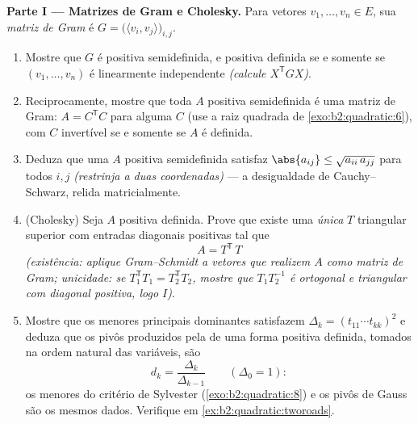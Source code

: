 \begin{problem}
\medskip
\noindent\textbf{Parte I --- Matrizes de Gram e Cholesky.} Para
vetores $v_1, \dots, v_n \in E$, sua \emph{matriz de Gram} é
$G = \bigl(\langle v_i, v_j\rangle\bigr)_{i,j}$.
\begin{enumerate}
  \item Mostre que $G$ é  positiva semidefinida, e
        positiva definida se e somente se $(v_1, \dots, v_n)$ é
        linearmente independente \emph{(calcule $X^{\mathsf T}GX$)}.
  \item Reciprocamente, mostre que toda $A$  positiva
        semidefinida é uma matriz de Gram: $A = C^{\mathsf T}C$
        para alguma $C$ (use a raiz quadrada de
        \cref{exo:b2:quadratic:6}), com $C$ invertível se e somente se $A$
        é definida.
  \item Deduza que uma $A$ positiva semidefinida satisfaz
        $\abs{a_{ij}} \leq \sqrt{a_{ii}\,a_{jj}}$ para todos $i,
        j$ \emph{(restrinja a duas coordenadas)} --- a
        desigualdade de Cauchy--Schwarz, relida matricialmente.
  \item (Cholesky) Seja $A$ positiva definida. Prove que
        existe uma \emph{única} $T$ triangular superior com
        entradas diagonais positivas tal que
        \[
        A = T^{\mathsf T}\,T
        \]
        \emph{(existência: aplique Gram--Schmidt a vetores
        que realizem $A$ como matriz de Gram; unicidade: se
        $T_1^{\mathsf T}T_1 = T_2^{\mathsf T}T_2$, mostre que
        $T_1T_2^{-1}$ é ortogonal e triangular com
        diagonal positiva, logo $I$)}.
  \item Mostre que os menores principais dominantes satisfazem
        $\Delta_k = (t_{11}\cdots t_{kk})^2$ e deduza que
        os pivôs produzidos pela  de uma
        forma positiva definida, tomados na ordem natural das
        variáveis, são
        \[
        d_k = \frac{\Delta_k}{\Delta_{k-1}}
        \qquad (\Delta_0 = 1) :
        \]
        os menores do critério de Sylvester
        (\cref{exo:b2:quadratic:8}) e os pivôs de Gauss são
        os mesmos dados. Verifique em
        \cref{ex:b2:quadratic:tworoads}.
\end{enumerate}


\end{problem}

